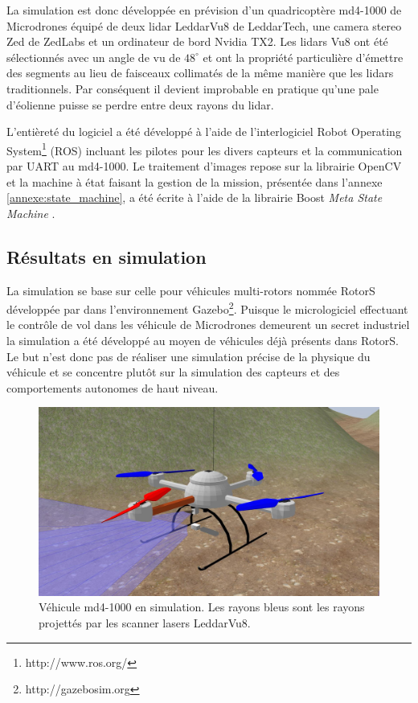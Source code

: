 La simulation est donc développée en prévision d'un quadricoptère md4-1000 de Microdrones équipé de deux lidar LeddarVu8 de LeddarTech, une camera stereo Zed de ZedLabs et un ordinateur de bord Nvidia TX2. Les lidars Vu8 ont été sélectionnés avec un angle de vu de $48^{\circ}$ et ont la propriété particulière d'émettre des segments au lieu de faisceaux collimatés de la même manière que les lidars traditionnels. Par conséquent il devient improbable en pratique qu'une pale d'éolienne puisse se perdre entre deux rayons du lidar.

L'entièreté du logiciel a été développé à l'aide de l'interlogiciel
Robot Operating System\footnote{http://www.ros.org/} (ROS) incluant les pilotes pour les divers capteurs et la communication par UART au md4-1000. Le traitement d'images repose sur la librairie OpenCV \citep{itseez2015} et la machine à état faisant la gestion de la mission, présentée dans l'annexe \ref{annexe:state_machine}, a été écrite à l'aide de la librairie Boost \textit{Meta State Machine} \citep{Schling2011}.

\subsection{Résultats en simulation}
\label{subsec:results_simu}
La simulation se base sur celle pour véhicules multi-rotors nommée RotorS développée par \citep{Furrer2016} dans l'environnement Gazebo\footnote{http://gazebosim.org}. Puisque le micrologiciel effectuant le contrôle de vol dans les véhicule de Microdrones demeurent un secret industriel la simulation a été développé au moyen de véhicules déjà présents dans RotorS.
Le but n'est donc pas de réaliser une simulation précise de la physique du véhicule et se concentre plutôt sur la simulation des capteurs et des comportements autonomes de haut niveau.

\begin{figure}[htp]
  \centering
    \centering
    \includegraphics[width=0.7\linewidth]{images/sim_vehicle_closeup.jpg}
  \caption{Véhicule md4-1000 en simulation. Les rayons bleus sont les rayons projettés par les scanner lasers LeddarVu8.}
  \label{fig:sim_vehicle_closeup}
\end{figure}

